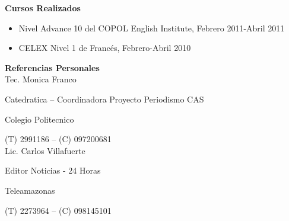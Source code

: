 \documentclass{article}
\begin{document}
{\large\textbf{Cursos Realizados}}\\

\begin{itemize}
\item{Nivel Advance 10 del COPOL English Institute, Febrero 2011-Abril 2011}
\item{CELEX Nivel 1 de Francés, Febrero-Abril 2010}\\
\end{itemize}

{\large\textbf{Referencias Personales}}\\

Tec. Monica Franco

Catedratica – Coordinadora Proyecto Periodismo CAS

Colegio Politecnico

(T) 2991186 – (C) 097200681 \\

Lic. Carlos Villafuerte

Editor Noticias - 24 Horas

Teleamazonas

(T) 2273964 – (C) 098145101
\end{document}
